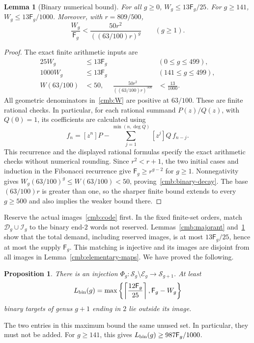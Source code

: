 \documentclass[11pt]{amsart}
\newtheorem{lemma}[theorem]{Lemma}
\newtheorem{proposition}[theorem]{Proposition}
\theoremstyle{definition}
\theoremstyle{remark}
\newcommand{\Fib}{\mathsf F}
\numberwithin{equation}{section}
\begin{document}
\begin{lemma}[Binary numerical bound]\label{cmb:binary-numerical}
For all $g\ge0$, $W_g\le13\Fib_g/25$. For $g\ge141$,
$W_g\le13\Fib_g/1000$. Moreover, with $r=809/500$,
\begin{equation}\label{cmb:binary-decay}
 \frac{W_g}{\Fib_g}<\frac{50r^2}{((63/100)r)^g}\qquad(g\ge1).
\end{equation}
\end{lemma}
\begin{proof}
The exact finite arithmetic inputs are
\begin{align*}
 25W_g&\le13\Fib_g &&(0\le g\le499),\\
 1000W_g&\le13\Fib_g &&(141\le g\le499),\\
 W(63/100)&<50,&
 \frac{50r^2}{((63/100)r)^{500}}&<\frac{13}{1000}.
\end{align*}
All geometric denominators in~\eqref{cmb:W} are positive at $63/100$.
These are finite rational checks. In particular, for each rational summand
$P(z)/Q(z)$, with $Q(0)=1$, its coefficients are calculated using
\begin{equation}\label{cmb:coefficient-recurrence}
 f_n=[z^n]P-\sum_{j=1}^{\min(n,\deg Q)}[z^j]Q\,f_{n-j}.
\end{equation}
This recurrence and the displayed rational formulas specify the exact
arithmetic checks without numerical rounding.
Since $r^2<r+1$, the two initial cases and induction in the Fibonacci
recurrence give $\Fib_g\ge r^{g-2}$ for $g\ge1$. Nonnegativity gives
$W_g(63/100)^g\le W(63/100)<50$, proving~\eqref{cmb:binary-decay}.
The base $(63/100)r$ is greater than one, so the sharper finite bound
extends to every $g\ge500$ and also implies the weaker bound there.
\end{proof}

Reserve the actual images~\eqref{cmb:code} first. In the fixed finite-set
orders, match $\mathcal D_g\cup\mathcal I_g$ to the binary end-$2$ words
not reserved. Lemmas~\ref{cmb:majorant} and~\ref{cmb:binary-numerical}
show that the total demand, including reserved images, is at most
$13\Fib_g/25$, hence at most the supply $\Fib_g$.
This matching is injective and its images are disjoint from all images
in Lemma~\ref{cmb:elementary-maps}. We have proved the following.

\begin{proposition}\label{cmb:partial}
There is an injection
$\Phi_g:\mathcal S_g\setminus\mathcal E_g\longrightarrow\mathcal S_{g+1}$.
At least
\begin{equation}\label{cmb:binary-capacity}
 L_{\rm bin}(g)=\max\left\{\left\lceil\frac{12\Fib_g}{25}\right\rceil,
                                      \Fib_g-W_g\right\}
\end{equation}
binary targets of genus $g+1$ ending in $2$ lie outside its image.
\end{proposition}
The two entries in this maximum bound the same unused set. In particular,
they must not be added. For $g\ge141$, this gives
$L_{\rm bin}(g)\ge987\Fib_g/1000$.
\end{document}
